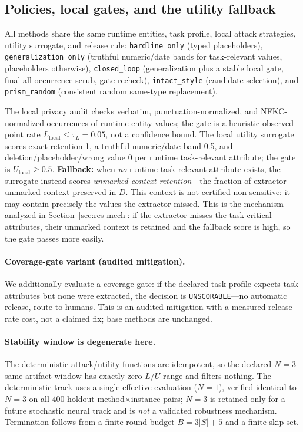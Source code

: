 \documentclass[11pt,a4paper]{article}
\begin{document}
\subsection{Policies, local gates, and the utility fallback}
All methods share the same runtime entities, task profile, local attack strategies, utility surrogate, and release rule: \texttt{hardline\_only} (typed placeholders), \texttt{generalization\_only} (truthful numeric/date bands for task-relevant values, placeholders otherwise), \texttt{closed\_loop} (generalization plus a stable local gate, final all-occurrence scrub, gate recheck), \texttt{intact\_style} (candidate selection), and \texttt{prism\_random} (consistent random same-type replacement).

The local privacy audit checks verbatim, punctuation-normalized, and NFKC-normalized occurrences of runtime entity values; the gate is a heuristic observed point rate $L_{\mathrm{local}}\le\tau_L=0.05$, not a confidence bound. The local utility surrogate scores exact retention 1, a truthful numeric/date band 0.5, and deletion/placeholder/wrong value 0 per runtime task-relevant attribute; the gate is $U_{\mathrm{local}}\ge0.5$. \textbf{Fallback:} when \emph{no} runtime task-relevant attribute exists, the surrogate instead scores \emph{unmarked-context retention}---the fraction of extractor-unmarked context preserved in $D$. This context is not certified non-sensitive: it may contain precisely the values the extractor missed. This is the mechanism analyzed in Section~\ref{sec:res-mech}: if the extractor misses the task-critical attributes, their unmarked context is retained and the fallback score is high, so the gate passes more easily.

\paragraph{Coverage-gate variant (audited mitigation).} We additionally evaluate a coverage gate: if the declared task profile expects task attributes but none were extracted, the decision is \texttt{UNSCORABLE}---no automatic release, route to humans. This is an audited mitigation with a measured release-rate cost, not a claimed fix; base methods are unchanged.

\paragraph{Stability window is degenerate here.} The deterministic attack/utility functions are idempotent, so the declared $N=3$ same-artifact window has exactly zero $L/U$ range and filters nothing. The deterministic track uses a single effective evaluation ($N=1$), verified identical to $N=3$ on all 400 holdout method$\times$instance pairs; $N=3$ is retained only for a future stochastic neural track and is \emph{not} a validated robustness mechanism. Termination follows from a finite round budget $B=3|S|+5$ and a finite skip set.
\end{document}
